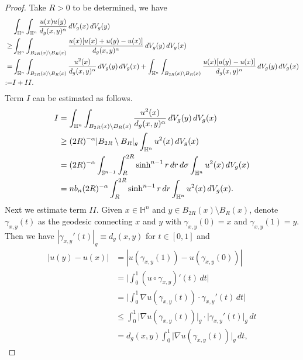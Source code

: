 \documentclass[11pt,reqno]{amsart}
\theoremstyle{definition}
\theoremstyle{remark}
\numberwithin{equation}{section}
\renewcommand{\(}{\left(}
\renewcommand{\)}{\right)}
\renewcommand{\-}{\overline}
\begin{document}
\begin{proof}
	Take $R>0$ to be determined, we have
\begin{align}
	&\int_{\mathbb{H}^n}\int_{\mathbb{H}^n}\frac{u(x)u(y)}{d_g(x,y)^{\alpha}}\,dV_g(x)\,dV_g(y)\notag\\
	\geq&\int_{\mathbb{H}^n}\int_{B_{2R}(x)\setminus B_R(x)}\frac{u(x)[u(x)+u(y)-u(x)]}{d_g(x,y)^{\alpha}}\,dV_g(y)\,dV_g(x)\notag\\
	=&\int_{\mathbb{H}^n}\int_{B_{2R}(x)\setminus B_R(x)}\frac{u^2(x)}{d_g(x,y)^{\alpha}}\,dV_g(y)\,dV_g(x)+\int_{\mathbb{H}^n}\int_{B_{2R}(x)\setminus B_R(x)}\frac{u(x)[u(y)-u(x)]}{d_g(x,y)^{\alpha}}\,dV_g(y)\,dV_g(x)\notag\\
	:=&I+II.\label{Eq-Inter1}
\end{align}
Term $I$ can be estimated as follows.
\begin{align}
	I&=\int_{\mathbb{H}^n}\int_{B_{2R}(x)\setminus B_R(x)}\frac{u^2(x)}{d_g(x,y)^{\alpha}}\,dV_g(y)\,dV_g(x)\notag\\
	&\geq (2R)^{-\alpha}|B_{2R}\setminus B_R|_g\int_{\mathbb{H}^n}{u^2(x)}\,dV_g(x)\notag\\
	&=(2R)^{-\alpha}\int_{\mathbb{S}^{n-1}}\int_R^{2R}\sinh^{n-1}r\,dr\,d\sigma\int_{\mathbb{H}^n}{u^2(x)}\,dV_g(x)\notag\\
	&=n b_n(2R)^{-\alpha}\int_R^{2R}\sinh^{n-1}r\,dr\int_{\mathbb{H}^n}{u^2(x)}\,dV_g(x).\label{Eq-Inter2}
\end{align}
Next we estimate term $II$. 
Given $x\in\mathbb{H}^n$ and $y\in B_{2R}(x)\setminus B_R(x)$, denote $\gamma_{x,y}(t)$ as the geodesic connecting $x$ and $y$ with $\gamma_{x,y}(0)=x$ and $\gamma_{x,y}(1)=y$. Then we have $|\gamma_{x,y}'(t)|_g\equiv d_g(x,y)$ for $t\in[0,1]$ and
\begin{align*}
	|u(y)-u(x)|&=|u(\gamma_{x,y}(1))-u(\gamma_{x,y}(0))|\\
	&=\bigg|\int_{0}^1{(u\circ\gamma_{x,y})'(t)}\,dt\bigg|\\
	&=\bigg|\int_{0}^1{\nabla u(\gamma_{x,y}(t))\cdot \gamma_{x,y}'(t)}\,dt\bigg|\\
	&\leq \int_{0}^1{\big|\nabla u(\gamma_{x,y}(t))\big|_g\cdot \big|\gamma_{x,y}'(t)}\big|_g\,dt\\
	&=d_g(x,y) \int_{0}^1{\big|\nabla u(\gamma_{x,y}(t))\big|_g}\,dt,
\end{align*}

\end{proof}
\end{document}
